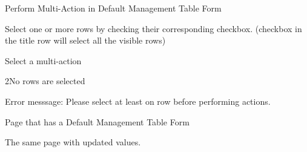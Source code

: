 
\begin{uc}{Perform Multi-Action in Default Management Table Form}

    \begin{uc-mss}
        \item Select one or more rows by checking their corresponding checkbox. (checkbox
        in the title row will select all the visible rows)
        \item Select a multi-action
    \end{uc-mss}

    \begin{uc-ext}

        \begin{uc-fail}{2}{No rows are selected}
        \item Error messsage: Please select at least on row before performing actions.
        \end{uc-fail}

    \end{uc-ext}

    \begin{uc-pre}
    \item Page that has a Default Management Table Form
    \end{uc-pre}

    \begin{uc-post}
    \item The same page with updated values.
    \end{uc-post}

\end{uc}

